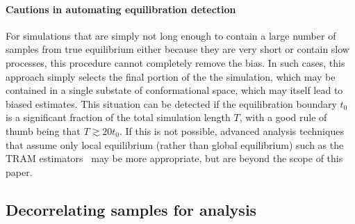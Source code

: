\documentclass[9pt,bestpractices]{livecoms}
\begin{document}
\paragraph{Cautions in automating equilibration detection}
For simulations that are simply not long enough to contain a large number of samples from true equilibrium either because they are very short or contain slow processes, this procedure cannot completely remove the bias.
In such cases, this approach simply selects the final portion of the the simulation, which may be contained in a single substate of conformational space, which may itself lead to biased estimates. 
This situation can be detected if the equilibration boundary $t_0$ is a significant fraction of the total simulation length $T$, with a good rule of thumb being that $T \gtrsim 20 t_0$.
If this is not possible, advanced analysis techniques that assume only local equilibrium (rather than global equilibrium) such as the TRAM estimators~\cite{mey2014xtram,wu2016multiensemble,nuske2017markov} may be more appropriate, but are beyond the scope of this paper. 
%
\subsection{Decorrelating samples for analysis}
\label{sec:decorrelating-samples}
\end{document}
